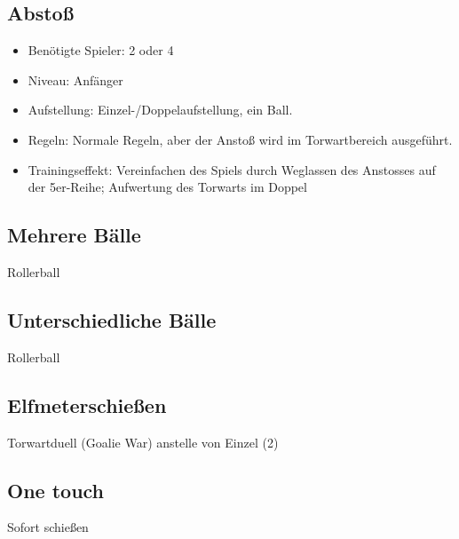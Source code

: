 \subsection{Abstoß}
\label{spielformen:sonderregeln:abstoss}

\begin{itemize}
\item Benötigte Spieler: 2 oder 4 
\item Niveau: Anfänger
\item Aufstellung: Einzel-/Doppelaufstellung, ein Ball.
\item Regeln: Normale Regeln, aber der Anstoß wird im Torwartbereich ausgeführt. 
\item Trainingseffekt: Vereinfachen des Spiels durch Weglassen des Anstosses auf der 5er-Reihe; Aufwertung des Torwarts im Doppel
\end{itemize}

\subsection{Mehrere Bälle}
\label{spielformen:sonderregeln:unterschiedlichebaelle}
Rollerball

\subsection{Unterschiedliche Bälle}
\label{spielformen:sonderregeln:mehrerebaelle}
Rollerball


\subsection{Elfmeterschießen}
\label{spielformen:sonderregeln:elfemeter}
Torwartduell (Goalie War) anstelle von Einzel (2)

\subsection{One touch}
\label{spielformen:sonderregeln:onetouch}
Sofort schießen

